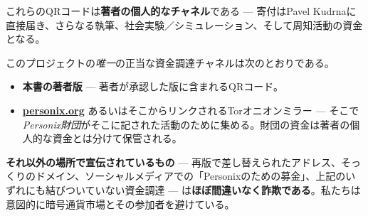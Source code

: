 \begin{minipage}[t]{0.60\textwidth}
\vspace{0pt}
\begin{mdframed}[
  linewidth=0.7pt,roundcorner=5pt,
  innerleftmargin=10pt,innerrightmargin=10pt,
  innertopmargin=8pt,innerbottommargin=8pt,
  skipabove=0pt,skipbelow=0pt,
  linecolor=cbwarning!50,backgroundcolor=cbwarning!5,
  nobreak=true,
  needspace=4\baselineskip,
]
\footnotesize
これらのQRコードは\textbf{著者の個人的なチャネル}である --- 寄付はPavel Kudrnaに直接届き、さらなる執筆、社会実験／シミュレーション、そして周知活動の資金となる。

\smallskip
このプロジェクトの\emph{唯一}の正当な資金調達チャネルは次のとおりである。

\smallskip
\begin{itemize}
\setlength{\itemsep}{0pt}
\setlength{\topsep}{0pt}
\item \textbf{本書の著者版} --- 著者が承認した版に含まれるQRコード。
\item \href{https://personix.org}{\textbf{personix.org}} あるいはそこからリンクされるTorオニオンミラー --- そこで\emph{Personix財団}がそこに記された活動のために集める。財団の資金は著者の個人的な資金とは分けて保管される。
\end{itemize}

\smallskip
\textbf{それ以外の場所で宣伝されているもの} --- 再版で差し替えられたアドレス、そっくりのドメイン、ソーシャルメディアでの「Personixのための募金」、上記のいずれにも結びついていない資金調達 --- は\textbf{ほぼ間違いなく詐欺である}。私たちは意図的に暗号通貨市場とその参加者を避けている。
\end{mdframed}
\end{minipage}

\clearpage
